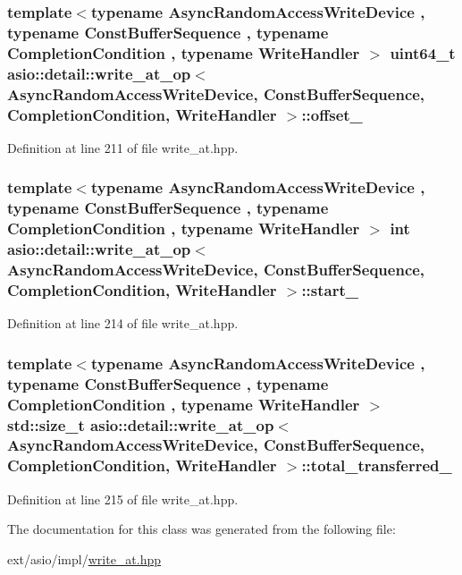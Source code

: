 \subsubsection[{offset\+\_\+}]{\setlength{\rightskip}{0pt plus 5cm}template$<$typename Async\+Random\+Access\+Write\+Device , typename Const\+Buffer\+Sequence , typename Completion\+Condition , typename Write\+Handler $>$ uint64\+\_\+t {\bf asio\+::detail\+::write\+\_\+at\+\_\+op}$<$ Async\+Random\+Access\+Write\+Device, Const\+Buffer\+Sequence, Completion\+Condition, Write\+Handler $>$\+::offset\+\_\+}\label{classasio_1_1detail_1_1write__at__op_ac4bd5bf64bbd90b4652fb80052199c50}


Definition at line 211 of file write\+\_\+at.\+hpp.

\hypertarget{classasio_1_1detail_1_1write__at__op_a21eba3719abc1e9fcc2a4cbcf8997413}{}
\subsubsection[{start\+\_\+}]{\setlength{\rightskip}{0pt plus 5cm}template$<$typename Async\+Random\+Access\+Write\+Device , typename Const\+Buffer\+Sequence , typename Completion\+Condition , typename Write\+Handler $>$ int {\bf asio\+::detail\+::write\+\_\+at\+\_\+op}$<$ Async\+Random\+Access\+Write\+Device, Const\+Buffer\+Sequence, Completion\+Condition, Write\+Handler $>$\+::start\+\_\+}\label{classasio_1_1detail_1_1write__at__op_a21eba3719abc1e9fcc2a4cbcf8997413}


Definition at line 214 of file write\+\_\+at.\+hpp.

\hypertarget{classasio_1_1detail_1_1write__at__op_a5c7c244023fc4c7c89c01c8698bbd2c2}{}
\subsubsection[{total\+\_\+transferred\+\_\+}]{\setlength{\rightskip}{0pt plus 5cm}template$<$typename Async\+Random\+Access\+Write\+Device , typename Const\+Buffer\+Sequence , typename Completion\+Condition , typename Write\+Handler $>$ std\+::size\+\_\+t {\bf asio\+::detail\+::write\+\_\+at\+\_\+op}$<$ Async\+Random\+Access\+Write\+Device, Const\+Buffer\+Sequence, Completion\+Condition, Write\+Handler $>$\+::total\+\_\+transferred\+\_\+}\label{classasio_1_1detail_1_1write__at__op_a5c7c244023fc4c7c89c01c8698bbd2c2}


Definition at line 215 of file write\+\_\+at.\+hpp.



The documentation for this class was generated from the following file\+:\begin{DoxyCompactItemize}
\item 
ext/asio/impl/\hyperlink{impl_2write__at_8hpp}{write\+\_\+at.\+hpp}\end{DoxyCompactItemize}
